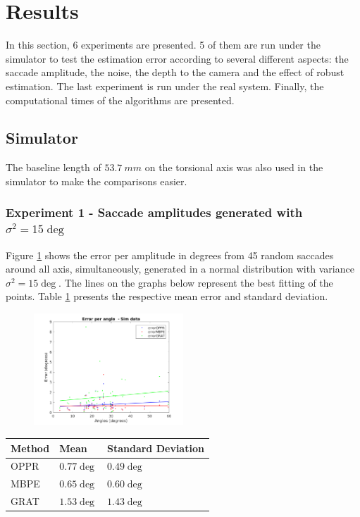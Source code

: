 \section{Results}
In this section, 6 experiments are presented. 5 of them are run under the simulator to test the estimation error according to several different aspects: the saccade amplitude, the noise, the depth to the camera and  the effect of robust estimation. The last experiment is run under the real system. Finally, the computational times of the algorithms are presented.
\label{sec:results}
\subsection{Simulator}
The baseline length of $53.7 \ mm$ on the torsional axis was also used in the simulator to make the comparisons easier.\\

\subsubsection{Experiment 1 - Saccade amplitudes generated with $\sigma^2 = 15 \deg $}
Figure \ref{cha5:sec1:45angle} shows the error per amplitude in degrees from 45 random saccades around all axis, simultaneously, generated in a normal distribution with variance $\sigma^2 = 15 \deg $. The lines on the graphs below represent the best fitting of the points. Table \ref{cha5:sec1:45anglet} presents the respective mean error and standard deviation. 
\begin{figure}
	\centering
	\includegraphics[width=0.5\textwidth]{images/45angle.png}
	\label{cha5:sec1:45angle}
\end{figure}
\begin{table}
	\centering
	\begin{tabular}{| l | l | l |}
		\hline
		Method & Mean & Standard Deviation \\
		\hline
		OPPR &  $0.77 \deg$ & $0.49 \deg$ \\
		\hline
		MBPE &  $0.65 \deg$ & $0.60 \deg$ \\
		\hline
		GRAT &  $1.53 \deg$ & $1.43 \deg$ \\ 
		\hline
	\end{tabular}
	\label{cha5:sec1:45anglet}
\end{table}\\

